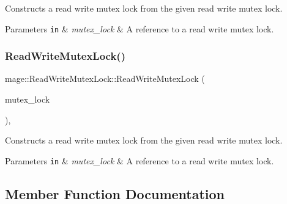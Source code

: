 Constructs a read write mutex lock from the given read write mutex lock.


\begin{DoxyParams}[1]{Parameters}
\mbox{\tt in}  & {\em mutex\+\_\+lock} & A reference to a read write mutex lock. \\
\hline
\end{DoxyParams}
\hypertarget{structmage_1_1_read_write_mutex_lock_ac1da0fa4a15d3dcae7a15ac3a8dcc8f9}{}\label{structmage_1_1_read_write_mutex_lock_ac1da0fa4a15d3dcae7a15ac3a8dcc8f9} 
\subsubsection{\texorpdfstring{Read\+Write\+Mutex\+Lock()}{ReadWriteMutexLock()}\hspace{0.1cm}{\footnotesize\ttfamily [3/3]}}
{\footnotesize\ttfamily mage\+::\+Read\+Write\+Mutex\+Lock\+::\+Read\+Write\+Mutex\+Lock (\begin{DoxyParamCaption}\item[{\hyperlink{structmage_1_1_read_write_mutex_lock}{Read\+Write\+Mutex\+Lock} \&\&}]{mutex\+\_\+lock }\end{DoxyParamCaption})\hspace{0.3cm}{\ttfamily [private]}, {\ttfamily [delete]}}

Constructs a read write mutex lock from the given read write mutex lock.


\begin{DoxyParams}[1]{Parameters}
\mbox{\tt in}  & {\em mutex\+\_\+lock} & A reference to a read write mutex lock. \\
\hline
\end{DoxyParams}


\subsection{Member Function Documentation}
\hypertarget{structmage_1_1_read_write_mutex_lock_ad3292e579d09107c7361989657b9bade}{}\label{structmage_1_1_read_write_mutex_lock_ad3292e579d09107c7361989657b9bade} 
